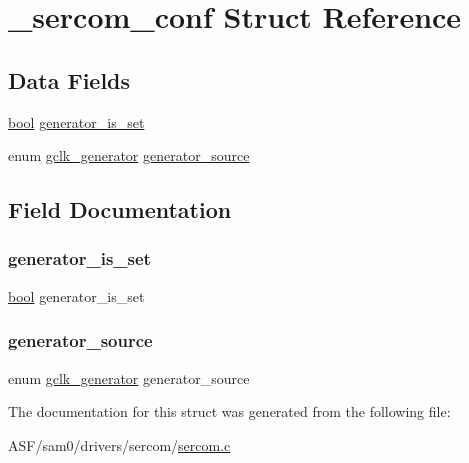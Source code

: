 \hypertarget{struct__sercom__conf}{}\section{\+\_\+sercom\+\_\+conf Struct Reference}
\label{struct__sercom__conf}
\subsection*{Data Fields}
\begin{DoxyCompactItemize}
\item 
\mbox{\hyperlink{group__group__sam0__utils_ga97a80ca1602ebf2303258971a2c938e2}{bool}} \mbox{\hyperlink{struct__sercom__conf_a2ea6b54664ddb4fa40938e42f3f90c8b}{generator\+\_\+is\+\_\+set}}
\item 
enum \mbox{\hyperlink{group__asfdoc__sam0__system__clock__group_ga1ab9bb87560ad127ed982591b7d67311}{gclk\+\_\+generator}} \mbox{\hyperlink{struct__sercom__conf_a2dba667c6d06bff254b7284d45dd02a3}{generator\+\_\+source}}
\end{DoxyCompactItemize}


\subsection{Field Documentation}
\mbox{\label{struct__sercom__conf_a2ea6b54664ddb4fa40938e42f3f90c8b}} 
\subsubsection{\texorpdfstring{generator\_is\_set}{generator\_is\_set}}
{\footnotesize\ttfamily \mbox{\hyperlink{group__group__sam0__utils_ga97a80ca1602ebf2303258971a2c938e2}{bool}} generator\+\_\+is\+\_\+set}

\mbox{\label{struct__sercom__conf_a2dba667c6d06bff254b7284d45dd02a3}} 
\subsubsection{\texorpdfstring{generator\_source}{generator\_source}}
{\footnotesize\ttfamily enum \mbox{\hyperlink{group__asfdoc__sam0__system__clock__group_ga1ab9bb87560ad127ed982591b7d67311}{gclk\+\_\+generator}} generator\+\_\+source}



The documentation for this struct was generated from the following file\+:\begin{DoxyCompactItemize}
\item 
A\+S\+F/sam0/drivers/sercom/\mbox{\hyperlink{sercom_8c}{sercom.\+c}}\end{DoxyCompactItemize}
